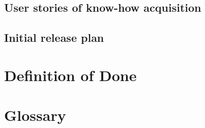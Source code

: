\section{User stories of know-how acquisition}

\section{Initial release plan}


\chapter{Definition of Done}


\chapter{Glossary}